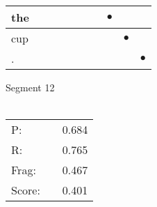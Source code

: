 \documentclass[landscape]{article}
\newcommand{\ssp}{\hspace{2pt}}
\newcommand{\mex}{\cellcolor{g}$\bullet$}
\begin{document}
\begin{tabular}{|l|p{10pt}|p{10pt}|p{10pt}|p{10pt}|p{10pt}|p{10pt}|p{10pt}|p{10pt}|p{10pt}|}
\hline
\ssp \cellcolor{ref6}the \ssp&\hspace{2pt}&\hspace{2pt}&\hspace{2pt}&\hspace{2pt}&\hspace{2pt}&\hspace{2pt}&\hspace{2pt}\mex&\hspace{2pt}&\hspace{2pt}\\
\hline
\ssp \cellcolor{ref7}cup \ssp&\hspace{2pt}&\hspace{2pt}&\hspace{2pt}&\hspace{2pt}&\hspace{2pt}&\hspace{2pt}&\hspace{2pt}&\hspace{2pt}\mex&\hspace{2pt}\\
\hline
\ssp \cellcolor{ref8}. \ssp&\hspace{2pt}&\hspace{2pt}&\hspace{2pt}&\hspace{2pt}&\hspace{2pt}&\hspace{2pt}&\hspace{2pt}&\hspace{2pt}&\hspace{2pt}\mex\\
\hline
\end{tabular}

\vspace{6pt}
\noindent Segment 12\\\\
\noindent\begin{tabular}{lm{12pt}r}
\hline
P:&&0.684\\
R:&&0.765\\
Frag:&&0.467\\
Score:&&0.401\\
\end{tabular}

\newpage
\end{document}
